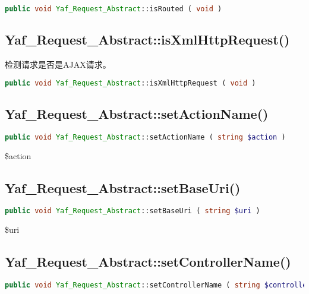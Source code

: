 \begin{lstlisting}[language=PHP]
public void Yaf_Request_Abstract::isRouted ( void )
\end{lstlisting}

\subsection{Yaf\_Request\_Abstract::isXmlHttpRequest()}

检测请求是否是AJAX请求。

\begin{lstlisting}[language=PHP]
public void Yaf_Request_Abstract::isXmlHttpRequest ( void )
\end{lstlisting}


\subsection{Yaf\_Request\_Abstract::setActionName()}

\begin{lstlisting}[language=PHP]
public void Yaf_Request_Abstract::setActionName ( string $action )
\end{lstlisting}

\begin{compactitem}
\item \$action
\end{compactitem}



\subsection{Yaf\_Request\_Abstract::setBaseUri()}

\begin{lstlisting}[language=PHP]
public void Yaf_Request_Abstract::setBaseUri ( string $uri )
\end{lstlisting}

\begin{compactitem}
\item \$uri
\end{compactitem}

\subsection{Yaf\_Request\_Abstract::setControllerName()}

\begin{lstlisting}[language=PHP]
public void Yaf_Request_Abstract::setControllerName ( string $controller )
\end{lstlisting}

